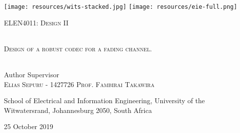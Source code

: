 


\newcommand{\HRule}{\centering{\rule{.9\linewidth}{.6pt}}} %

\newcommand{\decoRule}{\rule{.8\textwidth}{.4pt}} %


\begin{titlepage}
   
   	  \hspace{-2cm}
   	  \texttt{[image: resources/wits-stacked.jpg]}
   	  \hspace{0.50\textwidth}
   	  \texttt{[image: resources/eie-full.png]}
     
 \begin{center}
 	
 	
   	    \vspace*{\fill}
      	\textsc{
      		\LARGE
      		ELEN4011: Design II
      	}
      
      	\HRule \\[0.4cm] %
      
      	\textsc{
      		\LARGE
      	Design of a robust codec for a fading channel.}
      
      	\HRule \\[1.5cm] %
      	
      	
      	\hspace{0.60cm} Author \hspace{4.1cm} Supervisor\\
      	\hspace{0.45cm}\textsc{Elias Sepuru - 1427726} \hspace{1cm}\textsc{Prof. Fambirai Takawira}
      	
      	{
      		\vspace{1cm}
      		School of Electrical and Information Engineering,
      		University of the Witwatersrand, Johannesburg 2050, South Africa
      		\\
        }
    	
    	\vspace*{1cm}	
    	{25 October 2019}
    	
      	\vspace*{\fill}
    
 
   \end{center}
\end{titlepage}